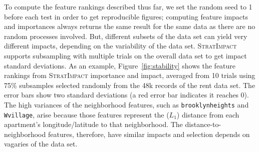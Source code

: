 \documentclass[11pt]{article}
\newcommand{\figref}[1]{Figure~\ref{#1}}
\newcommand{\simp}{\fontfamily{cmr}\textsc{\small StratImpact}}
\begin{document}
To compute the feature rankings described thus far, we set the random seed to 1 before each test in order to get reproducible figures; computing feature impacts and importances always returns the same result for the same data as there are no random processes involved.  But, different subsets of the data set can yield very different impacts, depending on the variability of the data set. \simp{} supports subsampling with multiple trials on the overall data set to get impact standard deviations.  As an example, \figref{fig:stability} shows the  feature rankings from \simp{} importance and impact, averaged from 10 trials using 75\% subsamples selected randomly from the 48k records of the rent data set. The error bars show two standard deviations (a red error bar indicates it reaches 0). The high variances of the neighborhood features, such as {\tt brooklynheights} and {\tt Wvillage}, arise because those features represent the ($L_1$) distance from each apartment's longitude/latitude to that neighborhood. The distance-to-neighborhood features, therefore, have similar impacts and selection depends on vagaries of the data set.
 
\end{document}
